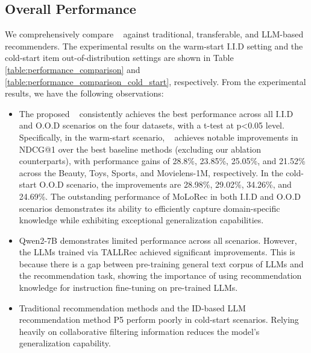 \subsection{Overall Performance}
We comprehensively compare \shortname~ against traditional, transferable, and LLM-based recommenders. The experimental results on the warm-start I.I.D setting and the cold-start item out-of-distribution settings are shown in Table \ref{table:performance_comparison} and \ref{table:performance_comparison_cold_start}, respectively. From the experimental results, we have the following observations:
\begin{itemize}[leftmargin=*]
    \item The proposed \shortname~ consistently achieves the best performance across all I.I.D and O.O.D scenarios on the four datasets, with a t-test at p<0.05 level.
    Specifically, in the warm-start scenario, \shortname~ achieves notable improvements in NDCG@1 over the best baseline methods (excluding our ablation counterparts), with performance gains of 28.8\%, 23.85\%, 25.05\%, and 21.52\% across the Beauty, Toys, Sports, and Movielens-1M, respectively. In the cold-start O.O.D scenario, the improvements are 28.98\%, 29.02\%, 34.26\%, and 24.69\%. The outstanding performance of MoLoRec in both I.I.D and O.O.D scenarios demonstrates its ability to efficiently capture domain-specific knowledge while exhibiting exceptional generalization capabilities.
    \item Qwen2-7B demonstrates limited performance across all scenarios. However, the LLMs trained via TALLRec achieved significant improvements. This is because there is a gap between pre-training general text corpus of LLMs and the recommendation task, showing the importance of using recommendation knowledge for instruction fine-tuning on pre-trained LLMs.
    \item Traditional recommendation methods and the ID-based LLM recommendation method P5 perform poorly in cold-start scenarios. Relying heavily on collaborative filtering information reduces the model's generalization capability.
\end{itemize}


